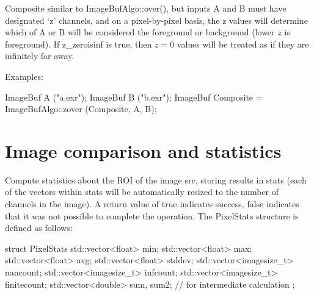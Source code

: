 

Composite similar to {\cf ImageBufAlgo::over()}, but inputs {\cf A} and
{\cf B} must have designated `z' channels, and on a pixel-by-pixel basis,
the z values will determine which of A or B will be considered the
foreground or background (lower $z$ is foreground).  If {\cf z_zeroisinf} is
{\cf true}, then $z=0$ values will be treated as if they are infinitely far
away.

\smallskip
\noindent Examples:
\begin{code}
    ImageBuf A ("a.exr");
    ImageBuf B ("b.exr");
    ImageBuf Composite = ImageBufAlgo::zover (Composite, A, B);
\end{code}
\apiend


\section{Image comparison and statistics}
\label{sec:iba:stats}

 
\label{sec:iba:computePixelStats}

Compute statistics about the ROI of the image {\cf src}, storing results
in {\cf stats} (each of the vectors within {\cf stats} will be
automatically resized to the number of channels in the image).  A return
value of {\cf true} indicates success, {\cf false} indicates that it was
not possible to complete the operation.
 The {\cf PixelStats} structure is defined as follows:
\begin{code}
struct PixelStats {
    std::vector<float> min;
    std::vector<float> max;
    std::vector<float> avg;
    std::vector<float> stddev;
    std::vector<imagesize_t> nancount;
    std::vector<imagesize_t> infcount;
    std::vector<imagesize_t> finitecount;
    std::vector<double> sum, sum2;  // for intermediate calculation
};
\end{code}

